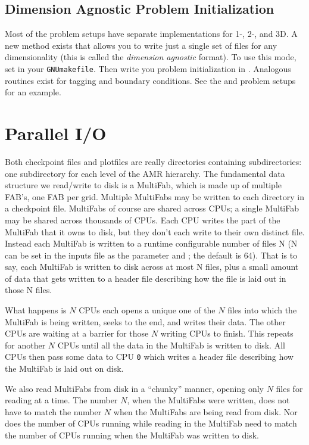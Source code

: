 \subsection{Dimension Agnostic Problem Initialization}

Most of the problem setups have separate implementations for 1-, 2-,
and 3D.  A new method exists that allows you to write just a single
set of files for any dimensionality (this is called the {\em dimension
  agnostic} format).  To use this mode, set
 in your {\tt GNUmakefile}.
Then write you problem initialization in .
Analogous routines exist for tagging and boundary conditions.  See the
 and  problem setups for an
example.

\section{Parallel I/O}

\label{software:io}

Both checkpoint files and plotfiles are really directories containing
subdirectories: one subdirectory for each level of the AMR hierarchy.
The fundamental data structure we read/write to disk is a MultiFab,
which is made up of multiple FAB's, one FAB per grid.  Multiple
MultiFabs may be written to each directory in a checkpoint file.
MultiFabs of course are shared across CPUs; a single MultiFab may be
shared across thousands of CPUs.  Each CPU writes the part of the
MultiFab that it owns to disk, but they don't each write to their own
distinct file.  Instead each MultiFab is written to a runtime
configurable number of files N (N can be set in the inputs file as the
parameter  and ; the
default is 64).  That is to say, each MultiFab is written to disk
across at most N files, plus a small amount of data that gets written
to a header file describing how the file is laid out in those N files.

What happens is $N$ CPUs each opens a unique one of the $N$ files into
which the MultiFab is being written, seeks to the end, and writes
their data.  The other CPUs are waiting at a barrier for those $N$
writing CPUs to finish.  This repeats for another $N$ CPUs until all the
data in the MultiFab is written to disk.  All CPUs then pass some data
to CPU {\tt 0} which writes a header file describing how the MultiFab is
laid out on disk.

We also read MultiFabs from disk in a ``chunky'' manner, opening only $N$
files for reading at a time.  The number $N$, when the MultiFabs were
written, does not have to match the number $N$ when the MultiFabs are
being read from disk.  Nor does the number of CPUs running while
reading in the MultiFab need to match the number of CPUs running when
the MultiFab was written to disk.

